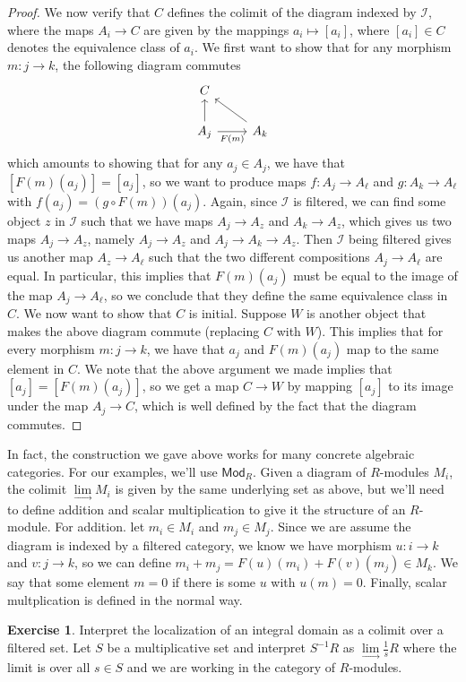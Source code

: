 \documentclass[psamsfonts]{amsart}
\theoremstyle{definition}
\newtheorem{exer}[thm]{Exercise}
\theoremstyle{remark}
\newcommand{\inv}{^{-1}}
\begin{document}
\begin{proof}
We now verify that $C$ defines the colimit of the diagram indexed by $\mathscr{I}$, where the maps $A_i \to C$ are given by the mappings $a_i \mapsto [a_i]$, where $[a_i] \in C$ denotes the equivalence class of $a_i$. We first want to show that for any morphism $m: j \to k$, the following diagram commutes
$$\begin{tikzcd}
C \\
A_j \arrow[u] \arrow[r,"F(m)"'] & A_k \arrow[ul]
\end{tikzcd}$$
which amounts to showing that for any $a_j \in A_j$, we have that $[F(m)(a_j) ] = [a_j]$, so we want to produce maps $f : A_j \to A_\ell$ and $g: A_k \to A_\ell$ with $f(a_j) = (g \circ F(m))(a_j)$. Again, since $\mathscr{I}$ is filtered, we can find some object $z$ in $\mathscr{I}$ such that we have maps $A_j \to A_z$ and $A_k \to A_z$, which gives us two maps $A_j \to A_z$, namely $A_j \to A_z$ and $A_j \to A_k \to A_z$. Then $\mathscr{I}$ being filtered gives us another map $A_z \to A_\ell$ such that the two different compositions $A_j \to A_\ell$ are equal. In particular, this implies that $F(m)(a_j)$ must be equal to the image of the map $A_j \to A_\ell$, so we conclude that they define the same equivalence class in $C$. We now want to show that $C$ is initial. Suppose $W$ is another object that makes the above diagram commute (replacing $C$ with $W$). This implies that for every morphism $m : j \to k$, we have that $a_j$ and $F(m)(a_j)$ map to the same element in $C$. We note that the above argument we made implies that $[a_j] = [F(m)(a_j)]$, so we get a map $C \to W$ by mapping $[a_j]$ to its image under the map $A_j \to C$, which is well defined by the fact that the diagram commutes.
\end{proof}
In fact, the construction we gave above works for many concrete algebraic categories. For our examples, we'll use $\mathsf{Mod}_R$. Given a diagram of $R$-modules $M_i$, the colimit $\lim\limits_\to M_i$ is given by the same underlying set as above, but we'll need to define addition and scalar multiplication to give it the structure of an $R$-module. For addition. let $m_i \in M_i$ and $m_j \in M_j$. Since we are assume the diagram is indexed by a filtered category, we know we have morphism $u: i \to k$ and $v : j \to k$, so we can define $m_i + m_j = F(u)(m_i) + F(v)(m_j) \in M_k$. We say that some element $m = 0$ if there is some $u$ with $u(m) = 0$. Finally, scalar multplication is defined in the normal way.
%
\begin{exer}
Interpret the localization of an integral domain as a colimit over a filtered set. Let $S$ be a multiplicative set and interpret $S\inv R$ as $\lim\limits_\to \frac{1}{s}R$ where the limit is over all $s \in S$ and we are working in the category of $R$-modules.
\end{exer}
\end{document}
